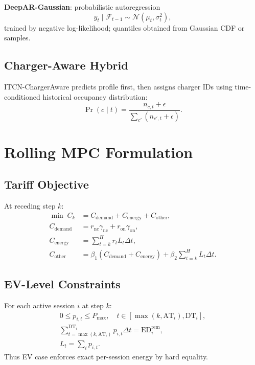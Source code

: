 \documentclass[journal]{IEEEtran}
\newcommand{\AT}{\mathrm{AT}}
\newcommand{\DT}{\mathrm{DT}}
\newcommand{\ED}{\mathrm{ED}}
\begin{document}
\textbf{DeepAR-Gaussian}: probabilistic autoregression
\begin{equation}
y_t\mid\mathcal{F}_{t-1}\sim\mathcal{N}(\mu_t,\sigma_t^2),
\end{equation}
trained by negative log-likelihood; quantiles obtained from Gaussian CDF or samples.

\subsection{Charger-Aware Hybrid}
ITCN-ChargerAware predicts profile first, then assigns charger IDs using time-conditioned historical occupancy distribution:
\begin{equation}
\Pr(c\mid t) = \frac{n_{c,t}+\epsilon}{\sum_{c'}(n_{c',t}+\epsilon)}.
\end{equation}

\section{Rolling MPC Formulation}

\subsection{Tariff Objective}
At receding step $k$:
\begin{align}
\min \; C_k &= C_{\mathrm{demand}}+C_{\mathrm{energy}}+C_{\mathrm{other}},\\
C_{\mathrm{demand}} &= r_{\mathrm{nc}}\gamma_{\mathrm{nc}}+r_{\mathrm{on}}\gamma_{\mathrm{on}},\\
C_{\mathrm{energy}} &= \sum_{t=k}^{H} r_tL_t\Delta t,\\
C_{\mathrm{other}} &= \beta_1(C_{\mathrm{demand}}+C_{\mathrm{energy}})+\beta_2\sum_{t=k}^{H}L_t\Delta t.
\end{align}

\subsection{EV-Level Constraints}
For each active session $i$ at step $k$:
\begin{align}
0\le p_{i,t}\le P_{\max}, \quad t\in[\max(k,\AT_i),\DT_i],\\
\sum_{t=\max(k,\AT_i)}^{\DT_i} p_{i,t}\Delta t = \ED_i^{\mathrm{rem}},\\
L_t=\sum_i p_{i,t}.
\end{align}
Thus EV case enforces exact per-session energy by hard equality.
\end{document}
